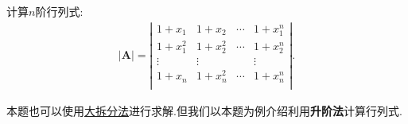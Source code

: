 \documentclass[lang=cn,newtx,10pt,scheme=chinese]{elegantbook}
\begin{document}
\begin{exercise}\label{升阶法的应用(1)例题}
计算$n$阶行列式:
\begin{align*}
|\boldsymbol{A}|=\left| \begin{matrix}
1+x_1&		1+x_2&		\cdots&		1+x_{1}^{n}\\1+x_{1}^{2}
&		1+x_{2}^{2}&		\cdots&		1+x_{2}^{n}\\
\vdots&		\vdots&		&		\vdots\\
1+x_n&		1+x_{n}^{2}&		\cdots&		1+x_{n}^{n}\\
\end{matrix} \right|.
\end{align*}
\end{exercise}
\begin{note}
本题也可以使用\hyperref[大拆分法]{大拆分法}进行求解.但我们以本题为例介绍利用\textbf{升阶法}计算行列式.
\end{note}
\end{document}
